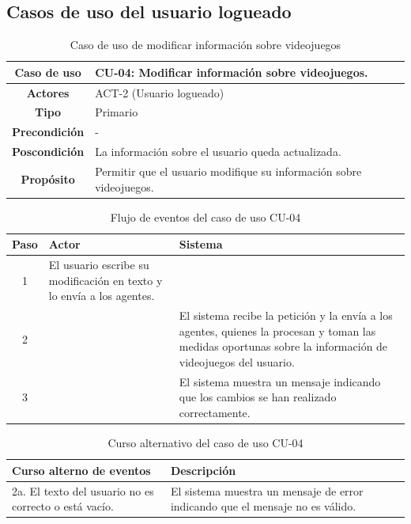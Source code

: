 \subsection{Casos de uso del usuario logueado}

\begin{table}[H]
\centering
\begin{tabular}{|c|p{10cm}|}
\hline
\rowcolor{green!40} \textbf{Caso de uso} & CU-04: Modificar información sobre videojuegos. \\ \hline
\rowcolor{blue!10} \textbf{Actores} & ACT-2 (Usuario logueado) \\ \hline
\rowcolor{blue!10} \textbf{Tipo} & Primario \\ \hline
\rowcolor{blue!10} \textbf{Precondición} & - \\ \hline
\rowcolor{blue!10} \textbf{Poscondición} & La información sobre el usuario queda actualizada. \\ \hline
\rowcolor{blue!10} \textbf{Propósito} & Permitir que el usuario modifique su información sobre videojuegos. \\ \hline
\end{tabular}
\caption{Caso de uso de modificar información sobre videojuegos}
\end{table}

\begin{table}[H]
\centering
\begin{tabular}{|c|p{5cm}|p{5cm}|}
\hline
\rowcolor{green!40} \textbf{Paso} & \textbf{Actor} & \textbf{Sistema} \\ \hline
\rowcolor{blue!10} 1 & El usuario escribe su modificación en texto y lo envía a los agentes. &  \\ \hline
\rowcolor{blue!10} 2 &  & El sistema recibe la petición y la envía a los agentes, quienes la procesan y toman las medidas oportunas sobre la información de videojuegos del usuario. \\ \hline
\rowcolor{blue!10} 3 &  & El sistema muestra un mensaje indicando que los cambios se han realizado correctamente. \\ \hline
\end{tabular}
\caption{Flujo de eventos del caso de uso CU-04}
\end{table}

\begin{table}[H]
\centering
\begin{tabular}{|p{4cm}|p{8cm}|}
\hline
\rowcolor{green!40} \textbf{Curso alterno de eventos} & \textbf{Descripción} \\ \hline
\rowcolor{blue!10} 2a. El texto del usuario no es correcto o está vacío. & El sistema muestra un mensaje de error indicando que el mensaje no es válido. \\ \hline
\end{tabular}
\caption{Curso alternativo del caso de uso CU-04}
\end{table}

